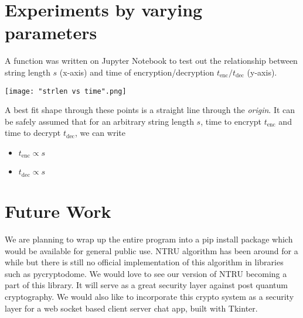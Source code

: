 \documentclass[a4paper,12pt]{article}
\begin{document}
\section{Experiments by varying parameters}
\begin{flushleft}
A function was written on Jupyter Notebook to test out the relationship between string length $s$ (x-axis) and time of encryption/decryption $t_{\text{enc}}/t_{\text{dec}}$ (y-axis).
\begin{center}
	\texttt{[image: "strlen vs time".png]}
\end{center}

A best fit shape through these points is a straight line through the \textit{origin}. It can be safely assumed that for an arbitrary string length $s$, time to encrypt $t_{\text{enc}}$ and time to decrypt $t_{\text{dec}}$, we can write
\end{flushleft}

\begin{itemize}
	\centering
	\item $t_{\text{enc}}\propto s$
	\item $t_{\text{dec}}\propto s$
\end{itemize}


\section{Future Work}
\begin{flushleft}
We are planning to wrap up the entire program into a pip install package which would be available for general public use. NTRU algorithm has been around for a while but there is still no official implementation of this algorithm in libraries such as pycryptodome. We would love to see our version of NTRU becoming a part of this library. It will serve as a great security layer against post quantum cryptography. We would also like to incorporate this crypto system as a security layer for a web socket based client server chat app, built with Tkinter.
\end{flushleft}
\newpage


\end{document}
